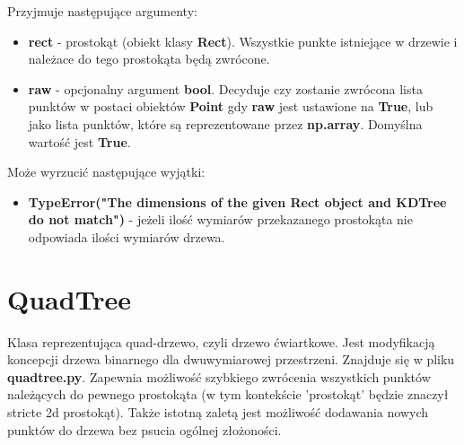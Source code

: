\documentclass[a4paper, 12pt]{article}
\begin{document}
\begin{itemize}
        \noindent
        \quad Przyjmuje następujące argumenty:
        \begin{itemize}
            \item \textbf{rect} - prostokąt (obiekt klasy \textbf{Rect}). Wszystkie punkte istniejące w drzewie i należace do tego prostokąta będą zwrócone.
            \item \textbf{raw} - opcjonalny argument \textbf{bool}. Decyduje czy zostanie zwrócona lista punktów w postaci obiektów \textbf{Point} gdy \textbf{raw} jest ustawione na \textbf{True}, lub jako lista punktów, które są reprezentowane przez \textbf{np.array}. Domyślna wartość jest \textbf{True}.
        \end{itemize}
        
        \noindent
        \quad Może wyrzucić następujące wyjątki:
        \begin{itemize}
            \item \textbf{TypeError("The dimensions of the given Rect object and KDTree do not match")} - jeżeli ilość wymiarów przekazanego prostokąta nie odpowiada ilości wymiarów drzewa.
        \end{itemize}
        \vspace{6pt}
    \end{itemize}


  \section{QuadTree}
    \quad Klasa reprezentująca quad-drzewo, czyli drzewo ćwiartkowe. Jest modyfikacją koncepcji drzewa binarnego dla dwuwymiarowej przestrzeni. Znajduje się w pliku \textbf{quadtree.py}. Zapewnia możliwość szybkiego zwrócenia wszystkich punktów należących do pewnego prostokąta (w tym kontekście 'prostokąt' będzie znaczył stricte 2d prostokąt). Także istotną zaletą jest możliwość dodawania nowych punktów do drzewa bez psucia ogólnej złożoności.
\end{document}
